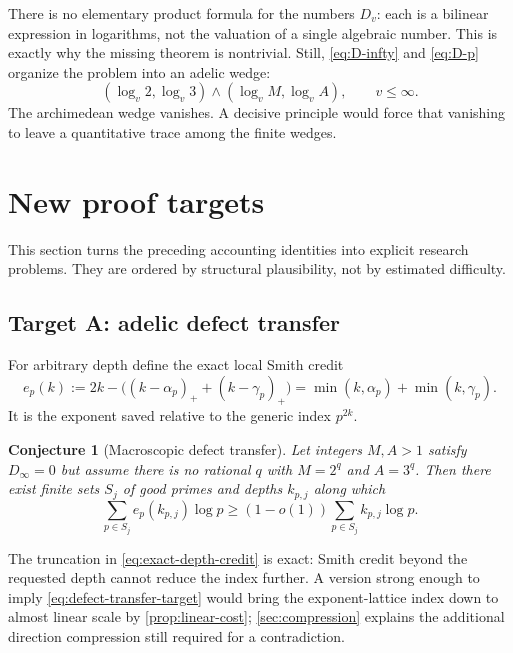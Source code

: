 \documentclass[11pt,oneside]{article}
\newtheorem{conjecture}[theorem]{Conjecture}
\theoremstyle{definition}
\begin{document}
There is no elementary product formula for the numbers $D_v$: each is a
bilinear expression in logarithms, not the valuation of a single algebraic
number.  This is exactly why the missing theorem is nontrivial.  Still,
\eqref{eq:D-infty} and \eqref{eq:D-p} organize the problem into an adelic
wedge:
\begin{equation}\label{eq:adelic-wedge}
  (\log_v2,\log_v3)\wedge(\log_vM,\log_vA),
  \qquad v\le\infty.
\end{equation}
The archimedean wedge vanishes.  A decisive principle would force that
vanishing to leave a quantitative trace among the finite wedges.

\section{New proof targets}\label{sec:targets}

This section turns the preceding accounting identities into explicit
research problems.  They are ordered by structural plausibility, not by
estimated difficulty.

\subsection{Target A: adelic defect transfer}

For arbitrary depth define the exact local Smith credit
\begin{equation}\label{eq:exact-depth-credit}
  e_p(k):=
  2k-\bigl((k-\alpha_p)_++(k-\gamma_p)_+\bigr)
  =\min(k,\alpha_p)+\min(k,\gamma_p).
\end{equation}
It is the exponent saved relative to the generic index $p^{2k}$.

\begin{conjecture}[Macroscopic defect transfer]\label{conj:defect-transfer}
Let integers $M,A>1$ satisfy $D_\infty=0$ but assume there is no rational
$q$ with $M=2^q$ and $A=3^q$.  Then there exist finite sets $S_j$ of good
primes and depths $k_{p,j}$ along which
\begin{equation}\label{eq:defect-transfer-target}
  \sum_{p\in S_j}e_p(k_{p,j})\log p
  \ge(1-o(1))\sum_{p\in S_j}k_{p,j}\log p.
\end{equation}
\end{conjecture}

The truncation in \eqref{eq:exact-depth-credit} is exact: Smith credit
beyond the requested depth cannot reduce the index further.  A version
strong enough to imply \eqref{eq:defect-transfer-target} would bring the
exponent-lattice index down to almost linear scale by
\cref{prop:linear-cost}; \cref{sec:compression} explains the additional
direction compression still required for a contradiction.
\end{document}
